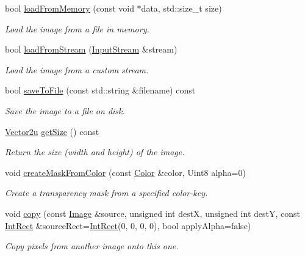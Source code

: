 \begin{DoxyCompactItemize}
bool \mbox{\hyperlink{classsf_1_1_image_aaa6c7afa5851a51cec6ab438faa7354c}{load\+From\+Memory}} (const void $\ast$data, std\+::size\+\_\+t size)
\begin{DoxyCompactList}\small\item\em Load the image from a file in memory. \end{DoxyCompactList}\item 
bool \mbox{\hyperlink{classsf_1_1_image_a21122ded0e8368bb06ed3b9acfbfb501}{load\+From\+Stream}} (\mbox{\hyperlink{classsf_1_1_input_stream}{Input\+Stream}} \&stream)
\begin{DoxyCompactList}\small\item\em Load the image from a custom stream. \end{DoxyCompactList}\item 
bool \mbox{\hyperlink{classsf_1_1_image_a51537fb667f47cbe80395cfd7f9e72a4}{save\+To\+File}} (const std\+::string \&filename) const
\begin{DoxyCompactList}\small\item\em Save the image to a file on disk. \end{DoxyCompactList}\item 
\mbox{\hyperlink{classsf_1_1_vector2}{Vector2u}} \mbox{\hyperlink{classsf_1_1_image_a85409951b05369813069ed64393391ce}{get\+Size}} () const
\begin{DoxyCompactList}\small\item\em Return the size (width and height) of the image. \end{DoxyCompactList}\item 
void \mbox{\hyperlink{classsf_1_1_image_a22f13f8c242a6b38eb73cc176b37ae34}{create\+Mask\+From\+Color}} (const \mbox{\hyperlink{classsf_1_1_color}{Color}} \&color, Uint8 alpha=0)
\begin{DoxyCompactList}\small\item\em Create a transparency mask from a specified color-\/key. \end{DoxyCompactList}\item 
void \mbox{\hyperlink{classsf_1_1_image_ab2fa337c956f85f93377dcb52153a45a}{copy}} (const \mbox{\hyperlink{classsf_1_1_image}{Image}} \&source, unsigned int destX, unsigned int destY, const \mbox{\hyperlink{classsf_1_1_rect}{Int\+Rect}} \&source\+Rect=\mbox{\hyperlink{classsf_1_1_rect}{Int\+Rect}}(0, 0, 0, 0), bool apply\+Alpha=false)
\begin{DoxyCompactList}\small\item\em Copy pixels from another image onto this one. \end{DoxyCompactList}\item 

\end{DoxyCompactItemize}
